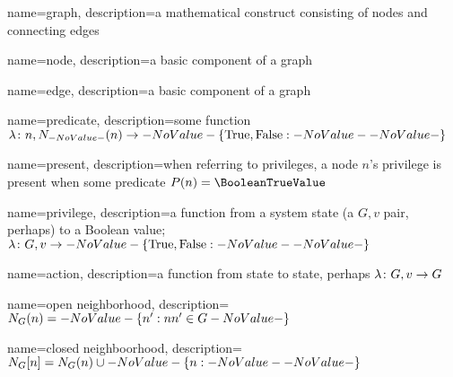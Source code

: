 
{
  name=graph,
  description={a mathematical construct consisting of nodes and connecting edges}
}

{
  name=node,
  description={a basic component of a graph}
}

{
  name=edge,
  description={a basic component of a graph}
}

{
  name=predicate,
  description={some function $\Function{n, \OpenNeighborhood{n}}{\SetBoolean}$}
}

{
  name=present,
  description={when referring to privileges, a node $n$'s privilege is present when some predicate $P(n) = \BooleanTrueValue$}
}

{
  name=privilege,
  description={a function from a system state (a $G, v$ pair, perhaps) to a Boolean value; $\Function{G, v}{\SetBoolean}$}
}

{
  name=action,
  description={a function from state to state, perhaps $\Function{G, v}{G}$}
}




{
  name=open neighborhood,
  description={$\OpenNeighborhood{n}[G] = \Set{n^\prime}[nn^\prime \in G]$}
}

{
  name=closed neighboorhood,
  description={$\ClosedNeighborhood{n}[G] = \OpenNeighborhood{n}[G] \cup \Set{n}$}
}

